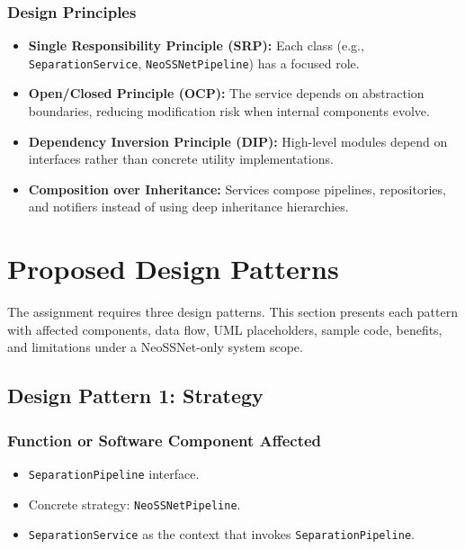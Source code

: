 \documentclass[12pt,a4paper]{report}
\begin{document}
\subsubsection*{Design Principles}
\begin{itemize}[nosep]
  \item \textbf{Single Responsibility Principle (SRP):} Each class (e.g., \texttt{SeparationService}, \texttt{NeoSSNetPipeline}) has a focused role.
  \item \textbf{Open/Closed Principle (OCP):} The service depends on abstraction boundaries, reducing modification risk when internal components evolve.
  \item \textbf{Dependency Inversion Principle (DIP):} High-level modules depend on interfaces rather than concrete utility implementations.
  \item \textbf{Composition over Inheritance:} Services compose pipelines, repositories, and notifiers instead of using deep inheritance hierarchies.
\end{itemize}

\section{Proposed Design Patterns}

The assignment requires three design patterns. This section presents each pattern with affected components, data flow, UML placeholders, sample code, benefits, and limitations under a NeoSSNet-only system scope.

\subsection{Design Pattern 1: Strategy}

\subsubsection*{Function or Software Component Affected}
\begin{itemize}[nosep]
  \item \texttt{SeparationPipeline} interface.
  \item Concrete strategy: \texttt{NeoSSNetPipeline}.
  \item \texttt{SeparationService} as the context that invokes \texttt{SeparationPipeline}.
\end{itemize}
\end{document}
